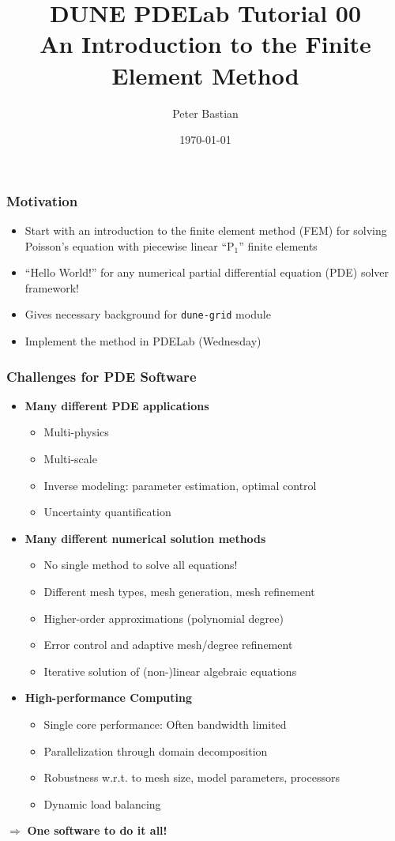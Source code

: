 \documentclass[ignorenonframetext,11pt]{beamer}
\title{DUNE PDELab Tutorial 00\\
  {\small  An Introduction to the Finite Element Method}}
\author{Peter Bastian}
\institute[]
  {
   Interdisziplinäres Zentrum für Wissenschaftliches Rechnen\\
   Im Neuenheimer Feld 205, D-69120 Heidelberg \\[6pt]
  }
\date[\today]{\today}
\theoremstyle{definition}
\begin{document}
\frame{\titlepage}


\begin{frame}
\frametitle{Motivation}
\begin{itemize}
\item Start with an introduction to the finite element method (FEM) for solving Poisson's equation
with piecewise linear ``P$_1$'' finite elements
\item ``Hello World!'' for any numerical partial differential equation (PDE) solver framework!
\item Gives necessary background for \lstinline{dune-grid} module
\item Implement the method in PDELab (Wednesday)
\end{itemize}
\end{frame}

\begin{frame}
\frametitle{Challenges for PDE Software}
\begin{itemize}
\item \textbf{Many different PDE applications}
\begin{itemize}
\item Multi-physics
\item Multi-scale
\item Inverse modeling: parameter estimation, optimal control
\item Uncertainty quantification
\end{itemize}
\item \textbf{Many different numerical solution methods}
\begin{itemize}
\item No single method to solve all equations!
\item Different mesh types,  mesh generation, mesh refinement
\item Higher-order approximations (polynomial degree)
\item Error control and adaptive mesh/degree refinement
\item Iterative solution of (non-)linear algebraic equations
\end{itemize}
\item \textbf{High-performance Computing}
\begin{itemize}
\item Single core performance: Often bandwidth limited
\item Parallelization through domain decomposition
\item Robustness w.r.t. to mesh size, model parameters,  processors
\item Dynamic load balancing
\end{itemize}
\end{itemize}
$\Rightarrow$ \textbf{One software to do it all!}
\end{frame}
\end{document}
